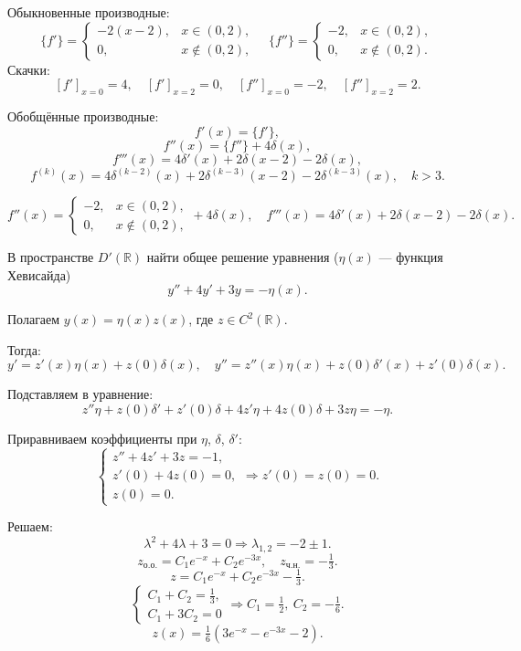 \begin{sol}
	Обыкновенные производные:
	\[
		\{f'\}=
		\begin{cases}
			-2(x-2), & x\in(0,2),    \\
			0,       & x\notin(0,2),
		\end{cases}
		\quad
		\{f''\}=
		\begin{cases}
			-2, & x\in(0,2),    \\
			0,  & x\notin(0,2).
		\end{cases}
	\]
	Скачки:
	\[
		[f']_{x=0}=4,\quad [f']_{x=2}=0,\quad [f'']_{x=0}=-2,\quad [f'']_{x=2}=2.
	\]

	Обобщённые производные:
	\[
		f'(x)=\{f'\},
	\]
	\[
		f''(x)=\{f''\}+4\delta(x),
	\]
	\[
		f'''(x)=4\delta'(x)+2\delta(x-2)-2\delta(x),
	\]
	\[
		f^{(k)}(x)=4\delta^{(k-2)}(x)+2\delta^{(k-3)}(x-2)-2\delta^{(k-3)}(x),\quad k>3.
	\]
\end{sol}

\begin{out}
	\[
		\boxed{
			f''(x)=
			\begin{cases}
				-2, & x\in(0,2),    \\
				0,  & x\notin(0,2),
			\end{cases}
			+4\delta(x),\quad
			f'''(x)=4\delta'(x)+2\delta(x-2)-2\delta(x).
		}
	\]
\end{out}


\begin{cond}
	В пространстве $D'(\mathbb{R})$ найти общее решение уравнения ($\eta(x)$ — функция Хевисайда)
	\[
		y'' + 4y' + 3y = -\eta(x).
	\]
\end{cond}

\begin{sol}
	Полагаем $y(x)=\eta(x)z(x)$, где $z\in C^2(\mathbb{R})$.

	Тогда:
	\[
		y' = z'(x)\eta(x)+z(0)\delta(x),
		\quad
		y'' = z''(x)\eta(x)+z(0)\delta'(x)+z'(0)\delta(x).
	\]

	Подставляем в уравнение:
	\[
		z''\eta+z(0)\delta'+z'(0)\delta+4z'\eta+4z(0)\delta+3z\eta=-\eta.
	\]

	Приравниваем коэффициенты при $\eta$, $\delta$, $\delta'$:
	\[
		\begin{cases}
			z''+4z'+3z=-1, \\
			z'(0)+4z(0)=0, \\
			z(0)=0.
		\end{cases}
		\Rightarrow z'(0)=z(0)=0.
	\]

	Решаем:
	\[
		\lambda^2+4\lambda+3=0 \Rightarrow \lambda_{1,2}=-2\pm1.
	\]
	\[
		z_{о.о.}=C_1e^{-x}+C_2e^{-3x},\quad z_{ч.н.}=-\tfrac{1}{3}.
	\]
	\[
		z=C_1e^{-x}+C_2e^{-3x}-\tfrac{1}{3}.
	\]
	\[
		\begin{cases}
			C_1+C_2=\tfrac{1}{3}, \\
			C_1+3C_2=0
		\end{cases}
		\Rightarrow
		C_1=\tfrac{1}{2},\ C_2=-\tfrac{1}{6}.
	\]
	\[
		z(x)=\tfrac{1}{6}(3e^{-x}-e^{-3x}-2).
	\]
\end{sol}

